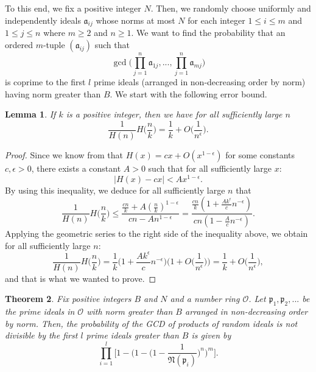 \documentclass[10pt,a4paper]{article}
\newtheorem{theorem}{Theorem}[section]
\newtheorem{lemma}[theorem]{Lemma}
\theoremstyle{definition}
\theoremstyle{remark}
\begin{document}
\vspace{.1 in}

To this end, we fix a positive integer $N$. Then, we randomly choose uniformly and independently ideals $\mathfrak{a}_{ij}$ whose norms at most $N$ for each integer $1 \leq i \leq m$ and $1 \leq j \leq n$ where $m \geq 2$ and $n \geq 1$. We want to find the probability that an ordered $m$-tuple $(\mathfrak{a}_{ij})$ such that 
$$\gcd\Big(\prod_{j=1}^n \mathfrak{a}_{1j}, ..., \prod_{j=1}^n \mathfrak{a}_{mj}\Big)$$
is coprime to the first $l$ prime ideals (arranged in non-decreasing order by norm) having norm greater than $B$. We start with the following error bound.

\begin{lemma} If $k$ is a positive integer, then we have for all sufficiently large $n$
$$\frac{1}{H(n)} H\Big(\frac{n}{k}\Big) = \frac{1}{k} + O\Big(\frac{1}{n^{\epsilon}}\Big).$$
\end{lemma}

\begin{proof}
Since we know from \cite{marcus_number_2012} that $H(x) = cx + O(x^{1-\epsilon})$ for some constants $c, \epsilon > 0$, there exists a constant $A > 0$ such that for all sufficiently large $x$:
$$|H(x) - cx| < Ax^{1-\epsilon}.$$
By using this inequality, we deduce for all sufficiently large $n$ that
$$\frac{1}{H(n)} H\Big(\frac{n}{k}\Big) \leq \frac{\frac{cn}{k} + A(\frac{n}{k})^{1-\epsilon}}{cn - An^{1-\epsilon}} = \frac{\frac{cn}{k} (1 + \frac{Ak^{\epsilon}}{c} n^{-\epsilon})}{cn(1 - \frac{A}{c}n^{-\epsilon})}.$$
Applying the geometric series to the right side of the inequality above, we obtain for all sufficiently large $n$:
$$\frac{1}{H(n)} H\Big(\frac{n}{k}\Big) = \frac{1}{k} \Big(1 + \frac{Ak^{\epsilon}}{c} n^{-\epsilon}\Big) \Big(1 + O\Big(\frac{1}{n^{\epsilon}}\Big)\Big) = \frac{1}{k} + O\Big(\frac{1}{n^{\epsilon}}\Big),$$
and that is what we wanted to prove.
\end{proof}

\begin{theorem}
Fix positive integers $B$ and $N$ and a number ring $\mathcal{O}$. Let $\mathfrak{p}_1, \mathfrak{p}_2, ...$ be the prime ideals in $\mathcal{O}$ with norm greater than $B$ arranged in non-decreasing order by norm. Then, the probability of the GCD of products of random ideals is not divisible by the first $l$ prime ideals greater than $B$ is given by 
$$\prod_{i=1}^{l} \Big[1 - \Big(1 - \Big(1-\frac{1}{\mathfrak{N}(\mathfrak{p}_i)}\Big)^n\Big)^m\Big].$$
\end{theorem}
\end{document}
